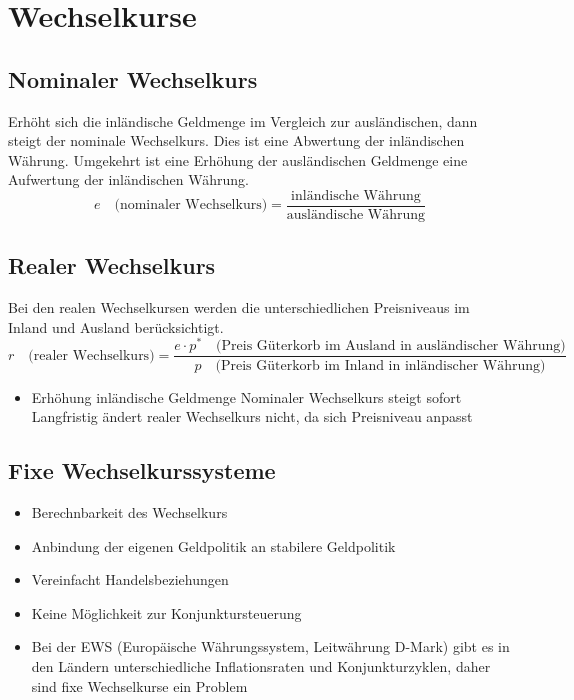 \section{Wechselkurse}
\subsection{Nominaler Wechselkurs}
Erhöht sich die inländische Geldmenge im Vergleich zur ausländischen, dann steigt der nominale Wechselkurs. Dies ist eine Abwertung der inländischen Währung. Umgekehrt ist eine Erhöhung der ausländischen Geldmenge eine Aufwertung der inländischen Währung. 
\begin{equation*}
 e\quad\text{(nominaler Wechselkurs)} = \frac{\text{inländische  Währung}}{\text{ausländische Währung}}
\end{equation*}
\subsection{Realer Wechselkurs}
Bei den realen Wechselkursen werden die unterschiedlichen Preisniveaus im Inland und Ausland berücksichtigt.
\begin{equation*}
	r\quad \text{(realer Wechselkurs)} = \frac{e \cdot p^{*}\quad \text{(Preis Güterkorb  im Ausland in  ausländischer  Währung)}}{p\quad \text{(Preis\ Güterkorb im Inland in inländischer Währung})}
\end{equation*}
\begin{itemize}
	\item Erhöhung inländische Geldmenge
	\subitem Nominaler Wechselkurs steigt sofort
	\subitem Langfristig ändert realer Wechselkurs nicht, da sich Preisniveau anpasst
\end{itemize}
\clearpage
\pagebreak
\subsection{Fixe Wechselkurssysteme}
\begin{itemize}
	\item Berechnbarkeit des Wechselkurs
	\item Anbindung der eigenen Geldpolitik an stabilere Geldpolitik
	\item Vereinfacht Handelsbeziehungen
	\item Keine Möglichkeit zur Konjunktursteuerung
	\item Bei der EWS (Europäische Währungssystem, Leitwährung D-Mark) gibt es in den Ländern unterschiedliche Inflationsraten und Konjunkturzyklen, daher sind fixe Wechselkurse ein Problem
\end{itemize}
